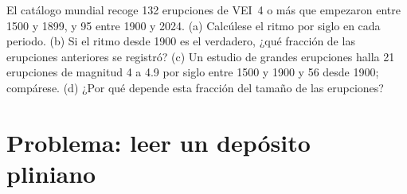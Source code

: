 \begin{exercise}[$\star\star\star$]\label{exo:b2:eruptive-styles:12}
El catálogo mundial recoge 132 erupciones de VEI~4 o más que empezaron entre 1500
y 1899, y 95 entre 1900 y 2024. (a) Calcúlese el ritmo por siglo en cada
periodo. (b) Si el ritmo desde 1900 es el verdadero, ¿qué fracción de las erupciones
anteriores se registró? (c) Un estudio de grandes erupciones halla 21 erupciones de
magnitud 4 a 4.9 por siglo entre 1500 y 1900 y 56 desde 1900; compárese.
(d) ¿Por qué depende esta fracción del tamaño de las erupciones?
\end{exercise}

\section{Problema: leer un depósito pliniano}


